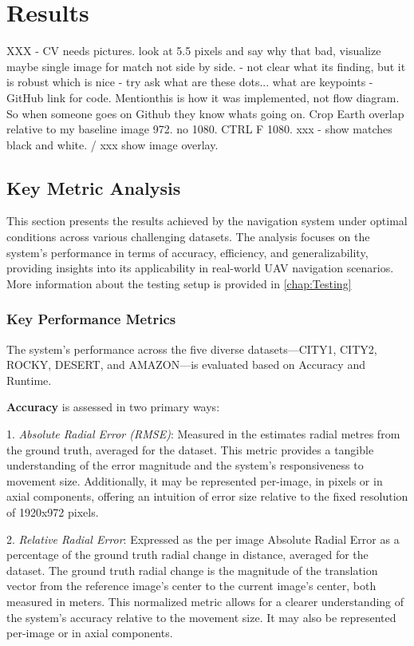 
\chapter{Results}


XXX - CV needs pictures. 
look at 5.5 pixels and say why that bad, visualize maybe
single image for match not side by side. - not clear what its finding, but it is robust which is nice - try ask what are these dots... what are keypoints 
- GitHub link for code. Mentionthis is how it was implemented, not flow diagram. So when someone goes on Github they know whats going on.
Crop Earth 
overlap relative to my baseline image 972. no 1080.  CTRL F 1080.
xxx - show matches black and white. / xxx show image overlay.

\section{Key Metric Analysis}

This section presents the results achieved by the navigation system under optimal conditions across various challenging datasets. The analysis focuses on the system's performance in terms of accuracy, efficiency, and generalizability, providing insights into its applicability in real-world UAV navigation scenarios. More information about the testing setup is provided in \ref{chap:Testing}

\subsection{Key Performance Metrics}

The system's performance across the five diverse datasets—CITY1, CITY2, ROCKY, DESERT, and AMAZON—is evaluated based on Accuracy and Runtime.

\textbf{Accuracy} is assessed in two primary ways:

1. \textit{Absolute Radial Error (RMSE)}: Measured in the estimates radial metres from the ground truth, averaged for the dataset. This metric provides a tangible understanding of the error magnitude and the system's responsiveness to movement size. Additionally, it may be represented per-image, in pixels or in axial components, offering an intuition of error size relative to the fixed resolution of 1920x972 pixels.

2. \textit{Relative Radial Error}: Expressed as the per image Absolute Radial Error as a percentage of the ground truth radial change in distance, averaged for the dataset. The ground truth radial change is the magnitude of the translation vector from the reference image's center to the current image's center, both measured in meters. This normalized metric allows for a clearer understanding of the system's accuracy relative to the movement size. It may also be represented per-image or in axial components.


